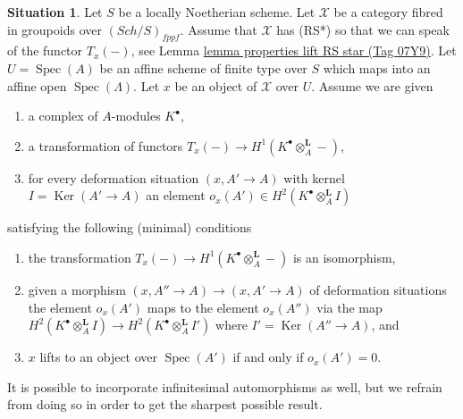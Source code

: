 \documentclass{amsart}
\theoremstyle{plain}
\theoremstyle{definition}
\newtheorem{situation}[subsection]{Situation}
\theoremstyle{remark}
\numberwithin{equation}{subsection}
\def\Spec{\mathop{\mathrm{Spec}}}
\def\Sch{\mathit{Sch}}
\def\Ker{\mathop{\mathrm{Ker}}}
\begin{document}
\begin{situation}
\label{situation-dual}
Let $S$ be a locally Noetherian scheme. Let $\mathcal{X}$ be a category
fibred in groupoids over $(\Sch/S)_{fppf}$. Assume that
$\mathcal{X}$ has (RS*) so that we can speak of the functor $T_x(-)$, see
Lemma \href{https://stacks.math.columbia.edu/tag/07Y9}{lemma properties lift RS star (Tag 07Y9)}.
Let $U = \Spec(A)$ be an affine scheme of finite type over $S$ which maps
into an affine open $\Spec(\Lambda)$. Let $x$ be an object of $\mathcal{X}$
over $U$. Assume we are given
\begin{enumerate}
\item a complex of $A$-modules $K^\bullet$,
\item a transformation of functors
$T_x(-) \to H^1(K^\bullet \otimes_A^\mathbf{L} -)$,
\item for every deformation situation $(x, A' \to A)$ with kernel
$I = \Ker(A' \to A)$ an element
$o_x(A') \in H^2(K^\bullet \otimes_A^\mathbf{L} I)$
\end{enumerate}
satisfying the following (minimal) conditions
\begin{enumerate}
\item[(i)] the transformation
$T_x(-) \to H^1(K^\bullet \otimes_A^\mathbf{L} -)$
is an isomorphism,
\item[(ii)] given a morphism $(x, A'' \to A) \to (x, A' \to A)$ of deformation
situations the element $o_x(A')$ maps to the element $o_x(A'')$
via the map
$H^2(K^\bullet \otimes_A^\mathbf{L} I) \to
H^2(K^\bullet \otimes_A^\mathbf{L} I')$
where $I' = \Ker(A'' \to A)$, and
\item[(iii)] $x$ lifts to an object over $\Spec(A')$ if and only if
$o_x(A') = 0$.
\end{enumerate}
It is possible to incorporate infinitesimal automorphisms as well, but
we refrain from doing so in order to get the sharpest possible result.
\end{situation}
\end{document}
